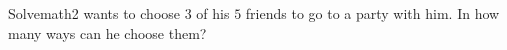 Solvemath2 wants to choose $3$ of his $5$ friends to go to a party with him. In how many ways can he choose them?
